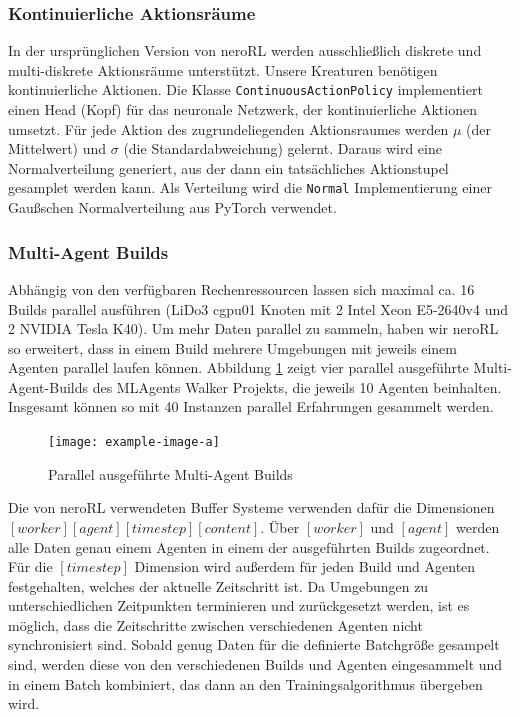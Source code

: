 \subsubsection{Kontinuierliche Aktionsräume}
In der ursprünglichen Version von neroRL werden ausschließlich diskrete und multi-diskrete Aktionsräume unterstützt. Unsere Kreaturen benötigen kontinuierliche Aktionen. Die Klasse \texttt{ContinuousActionPolicy} implementiert einen Head (Kopf) für das neuronale Netzwerk, der kontinuierliche Aktionen umsetzt. Für jede Aktion des zugrundeliegenden Aktionsraumes werden $\mu$ (der Mittelwert) und $\sigma$ (die Standardabweichung) gelernt. Daraus wird eine Normalverteilung generiert, aus der dann ein tatsächliches Aktionstupel gesamplet werden kann. Als Verteilung wird die \texttt{Normal} Implementierung einer Gaußschen Normalverteilung aus PyTorch verwendet.

\subsubsection{Multi-Agent Builds}
Abhängig von den verfügbaren Rechenressourcen lassen sich maximal ca. 16 Builds parallel ausführen (LiDo3 cgpu01 Knoten mit 2 Intel Xeon E5-2640v4 und 2 NVIDIA Tesla K40). Um mehr Daten parallel zu sammeln, haben wir neroRL so erweitert, dass in einem Build mehrere Umgebungen mit jeweils einem Agenten parallel laufen können. Abbildung \ref{fig:multi-agent-builds} zeigt vier parallel ausgeführte Multi-Agent-Builds des MLAgents Walker Projekts, die jeweils 10 Agenten beinhalten. Insgesamt können so mit 40 Instanzen parallel Erfahrungen gesammelt werden.
\begin{figure}
	\centering
	\texttt{[image: example-image-a]}
	\caption{Parallel ausgeführte Multi-Agent Builds}
	\label{fig:multi-agent-builds}
\end{figure}
Die von neroRL verwendeten Buffer Systeme verwenden dafür die Dimensionen $[worker][agent][timestep][content]$. Über $[worker]$ und $[agent]$ werden alle Daten genau einem Agenten in einem der ausgeführten Builds zugeordnet. Für die $[timestep]$ Dimension wird außerdem für jeden Build und Agenten festgehalten, welches der aktuelle Zeitschritt ist. Da Umgebungen zu unterschiedlichen Zeitpunkten terminieren und zurückgesetzt werden, ist es möglich, dass die Zeitschritte zwischen verschiedenen Agenten nicht synchronisiert sind. Sobald genug Daten für die definierte Batchgröße gesampelt sind, werden diese von den verschiedenen Builds und Agenten eingesammelt und in einem Batch kombiniert, das dann an den Trainingsalgorithmus übergeben wird.

